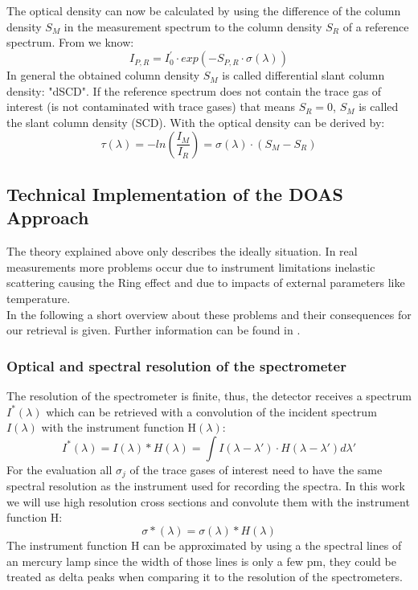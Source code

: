 \documentclass  [
  paper    = a4,
  BCOR     = 10mm,
  twoside,
  fontsize = 12pt,
  fleqn,
  toc      = bibnumbered,
  toc      = listofnumbered,
  numbers  = noendperiod,
  headings = normal,
  listof   = leveldown,
  version  = 3.03
]                                       {scrreprt}
\begin{document}
	The optical density can now be calculated by using the difference of the column density $S_{M}$ in the measurement spectrum to the column density $S_{R}$ of a reference spectrum. From  we know:	
	\begin{equation}
	I_{P,R} = I^{'}_{0}\cdot exp\left(-S_{P,R}\cdot\sigma\left(\lambda\right)\right)
	\label{eq:smr}
	\end{equation}
	In general the obtained column density $S_{M}$ is called differential slant column density: "dSCD". If the reference spectrum does not contain the trace gas of interest (is not contaminated with trace gases) that means $S_{R} = 0$, $S_{M}$ is called the slant column	density (SCD). 
	With  the optical density can be derived by:
	\begin{equation}
	\tau\left(\lambda\right) = -ln\left(\frac{I_{M}}{I_{R}}\right) = \sigma\left(\lambda\right)\cdot\left(S_{M}-S_{R}\right)
	\end{equation}

	
	
	\subsection{Technical Implementation of the DOAS Approach}
	The theory explained above only describes the ideally situation. In real measurements more problems occur due to instrument limitations inelastic scattering causing the Ring effect and due to impacts of external parameters like temperature.\\
	In the following a short overview about these problems and their consequences for our retrieval is given. Further information can be found in \cite{lubcke2014optical}.\\
	\subsubsection*{Optical and spectral resolution of the spectrometer}
	The resolution of the spectrometer is finite, thus, the detector receives a spectrum $I^{*}\left(\lambda\right)$ which can be retrieved with a convolution of the incident spectrum $I\left(\lambda\right)$ with the instrument function H$\left(\lambda\right)$:
	\begin{equation}
	I^{*}\left(\lambda\right) = I\left(\lambda\right)*H\left(\lambda\right)=\int I\left(\lambda-\lambda{'}\right)\cdot H\left(\lambda-\lambda{'}\right)d\lambda{'}
	\end{equation} 
	For the evaluation all $\sigma_{j}$  of the trace gases of interest need to have the same spectral resolution as the instrument used for recording the spectra. In this work we will use high resolution cross sections and convolute them with the instrument function H:
	\begin{equation}
	\sigma{*}\left(\lambda\right) = \sigma\left(\lambda\right)*H\left(\lambda\right)
	\end{equation}
	The instrument function H can be approximated by using a the spectral lines of an mercury lamp since the width of those lines is only a few pm, they could be treated as delta peaks when comparing it to the resolution of the spectrometers.
	
\end{document}
